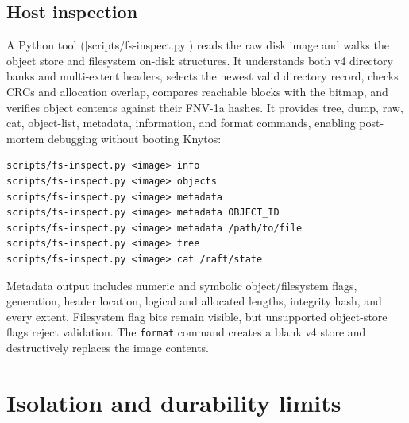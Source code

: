 \subsection{Host inspection}

A Python tool (\repofile|scripts/fs-inspect.py|) reads the raw disk image and
walks the object store and filesystem on-disk structures. It understands both
v4 directory banks and multi-extent headers, selects the newest valid directory
record, checks CRCs and allocation overlap, compares reachable blocks with the
bitmap, and verifies object contents against their FNV-1a hashes. It provides
tree, dump, raw, cat, object-list, metadata, information, and format commands,
enabling post-mortem debugging without booting Knytos:

\begin{verbatim}
scripts/fs-inspect.py <image> info
scripts/fs-inspect.py <image> objects
scripts/fs-inspect.py <image> metadata
scripts/fs-inspect.py <image> metadata OBJECT_ID
scripts/fs-inspect.py <image> metadata /path/to/file
scripts/fs-inspect.py <image> tree
scripts/fs-inspect.py <image> cat /raft/state
\end{verbatim}

Metadata output includes numeric and symbolic object/filesystem flags,
generation, header location, logical and allocated lengths, integrity hash, and
every extent. Filesystem flag bits remain visible, but unsupported object-store flags
reject validation. The \texttt{format} command creates a blank v4 store and
destructively replaces the image contents.

\section{Isolation and durability limits}

